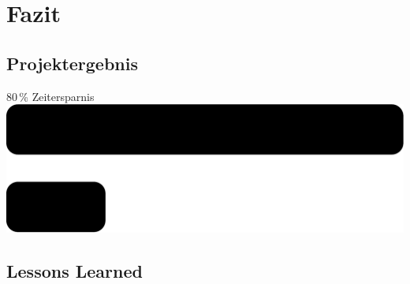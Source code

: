 \section{Fazit}
\subsection{Projektergebnis}
\begin{frame}{80\,\% Zeitersparnis}
\includegraphics[width=\textwidth]{Balken}
\end{frame}
\subsection{Lessons Learned}
\begin{frame}{}

\end{frame}



